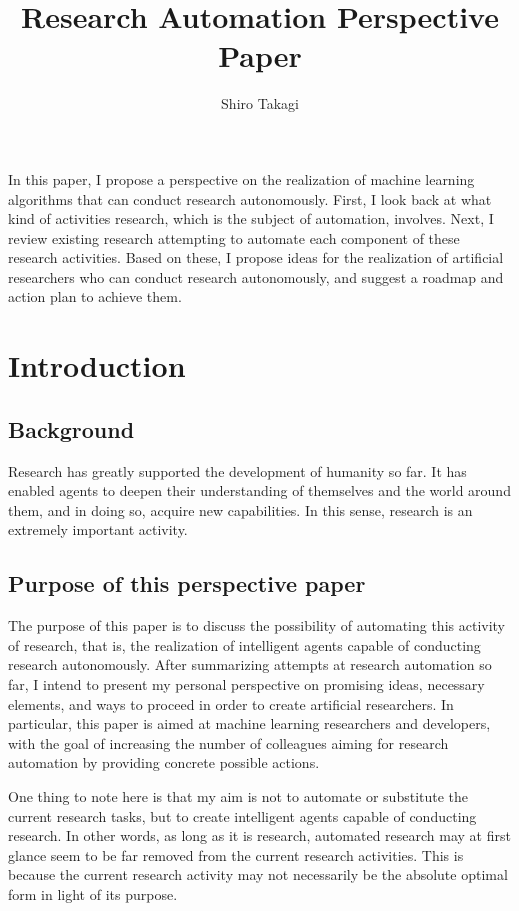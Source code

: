 \documentclass{book}
\title{Research Automation Perspective Paper}
\author{Shiro Takagi}
\newenvironment{abstract}{}{}
\begin{document}
\sloppy
\maketitle
\tableofcontents

\begin{abstract}
    In this paper, I propose a perspective on the realization of machine learning algorithms that can conduct research autonomously. First, I look back at what kind of activities research, which is the subject of automation, involves. Next, I review existing research attempting to automate each component of these research activities. Based on these, I propose ideas for the realization of artificial researchers who can conduct research autonomously, and suggest a roadmap and action plan to achieve them.
\end{abstract}

\chapter{Introduction}

\section{Background}
Research has greatly supported the development of humanity so far. It has enabled agents to deepen their understanding of themselves and the world around them, and in doing so, acquire new capabilities. In this sense, research is an extremely important activity.

\section{Purpose of this perspective paper}

The purpose of this paper is to discuss the possibility of automating this activity of research, that is, the realization of intelligent agents capable of conducting research autonomously. After summarizing attempts at research automation so far, I intend to present my personal perspective on promising ideas, necessary elements, and ways to proceed in order to create artificial researchers. In particular, this paper is aimed at machine learning researchers and developers, with the goal of increasing the number of colleagues aiming for research automation by providing concrete possible actions.

One thing to note here is that my aim is not to automate or substitute the current research tasks, but to create intelligent agents capable of conducting research. In other words, as long as it is research, automated research may at first glance seem to be far removed from the current research activities. This is because the current research activity may not necessarily be the absolute optimal form in light of its purpose. 
\end{document}
